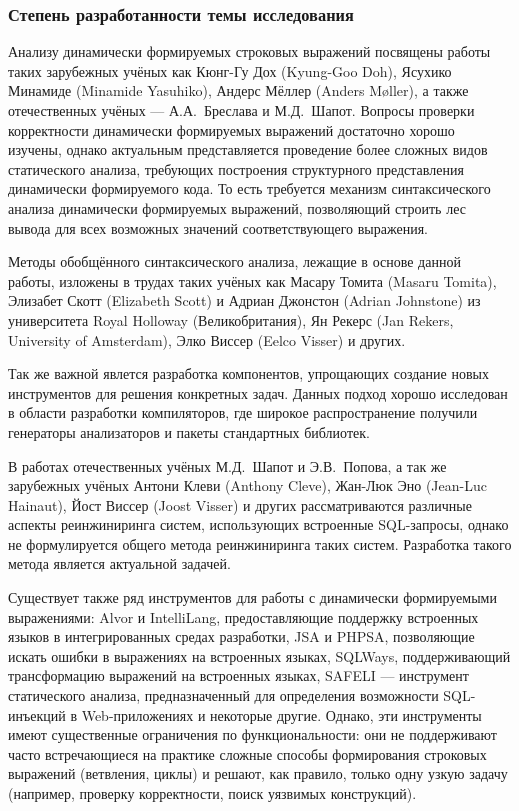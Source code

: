 \subsubsection*{\large{Степень разработанности темы исследования}}

Анализу динамически формируемых строковых выражений посвящены работы таких зарубежных учёных как Кюнг-Гу Дох (Kyung-Goo Doh), Ясухико Минамиде (Minamide Yasuhiko), Андерс Мёллер (Anders M{\o}ller), а также отечественных учёных --- А.А.~Бреслава и М.Д.~Шапот. Вопросы проверки корректности динамически формируемых выражений достаточно хорошо изучены, однако актуальным представляется проведение более сложных видов статического анализа, требующих построения структурного представления динамически формируемого кода. То есть требуется механизм синтаксического анализа динамически формируемых выражений, позволяющий строить лес вывода для всех возможных значений соответствующего выражения. 

Методы обобщённого синтаксического анализа, лежащие в основе данной работы, изложены в трудах таких учёных как Масару Томита (Masaru Tomita), Элизабет Скотт (Elizabeth Scott) и Адриан Джонстон (Adrian Johnstone) из университета Royal Holloway (Великобритания), Ян Рекерс (Jan Rekers, University of Amsterdam), Элко Виссер (Eelco Visser) и других.

Так же важной явлется разработка компонентов, упрощающих создание новых инструментов для решения конкретных задач. Данных подход хорошо исследован в области разработки компиляторов, где широкое распространение получили генераторы анализаторов и пакеты стандартных библиотек. 

В работах отечественных учёных М.Д.~Шапот  и Э.В.~Попова, а так же зарубежных учёных Антони Клеви (Anthony Cleve), Жан-Люк Эно (Jean-Luc Hainaut), Йост Виссер (Joost Visser) и других рассматриваются различные аспекты реинжиниринга систем, использующих встроенные SQL-запросы, однако не формулируется общего метода реинжиниринга таких систем. Разработка такого метода является актуальной задачей.

Существует также ряд инструментов для работы с динамически формируемыми выражениями: Alvor и IntelliLang, предоставляющие поддержку встроенных языков в интегрированных средах разработки, JSA и PHPSA, позволяющие искать ошибки в выражениях на встроенных языках, SQLWays, поддерживающий трансформацию выражений на встроенных языках, SAFELI --- инструмент статического анализа, предназначенный для определения возможности SQL-инъекций в Web-приложениях и некоторые другие. Однако, эти инструменты имеют существенные ограничения по функциональности: они не поддерживают часто встречающиеся на практике сложные способы формирования строковых выражений (ветвления, циклы) и решают, как правило, только одну узкую задачу (например, проверку корректности, поиск уязвимых конструкций).

